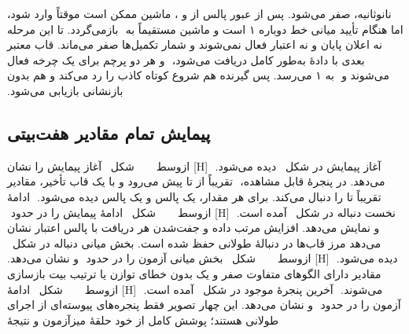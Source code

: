 ‫نانوثانیه، صفر می‌شود. پس از عبور پالس از  و ، ماشین ممکن
‫است موقتاً وارد  شود، اما هنگام تأیید میانی خط دوباره ۱ است و ماشین مستقیماً به
‫ بازمی‌گردد. تا این مرحله نه اعلان پایان و نه اعتبار فعال نمی‌شوند و شمار تکمیل‌ها
‫صفر می‌ماند. قاب معتبر بعدی با دادهٔ  به‌طور کامل دریافت می‌شود،
‫ و هر دو پرچم برای یک چرخه فعال می‌شوند و
‫ به ۱ می‌رسد. پس گیرنده هم شروع کوتاه کاذب را رد می‌کند و هم بدون
‫بازنشانی بازیابی می‌شود.
‫
‫
‫\subsection{پیمایش تمام مقادیر هفت‌بیتی}
‫
‫آغاز پیمایش در شکل~ دیده می‌شود.
‫
‫[H]
‫‌ازوسط
‫
‫
‫
‫
‫
‫شکل~ آغاز پیمایش را نشان می‌دهد. در پنجرهٔ قابل مشاهده،
‫ تقریباً از  تا  پیش می‌رود و  با
‫یک قاب تأخیر، مقادیر تقریباً  تا  را دنبال می‌کند. برای هر مقدار، یک
‫پالس  و یک پالس  دیده می‌شود.
‫
‫ادامهٔ نخست دنباله در شکل~ آمده است.
‫
‫[H]
‫‌ازوسط
‫
‫
‫
‫
‫
‫شکل~ ادامهٔ پیمایش را در حدود
‫ و  نمایش می‌دهد. افزایش مرتب
‫داده و جفت‌شدن هر دریافت با پالس اعتبار نشان می‌دهد مرز قاب‌ها در دنبالهٔ طولانی حفظ شده
‫است.
‫
‫بخش میانی دنباله در شکل~ دیده می‌شود.
‫
‫[H]
‫‌ازوسط
‫
‫
‫
‫
‫
‫شکل~ بخش میانی آزمون را در حدود
‫ و  نشان می‌دهد. مقادیر دارای
‫الگوهای متفاوت صفر و یک بدون خطای توازن یا ترتیب بیت بازسازی می‌شوند.
‫
‫آخرین پنجرهٔ موجود در شکل~ آمده است.
‫
‫[H]
‫‌ازوسط
‫
‫
‫
‫
‫
‫شکل~ ادامهٔ آزمون را در حدود
‫ و  نشان می‌دهد. این چهار تصویر
‫فقط پنجره‌های پیوسته‌ای از اجرای طولانی هستند؛ پوشش کامل از خود حلقهٔ میزآزمون و نتیجهٔ
